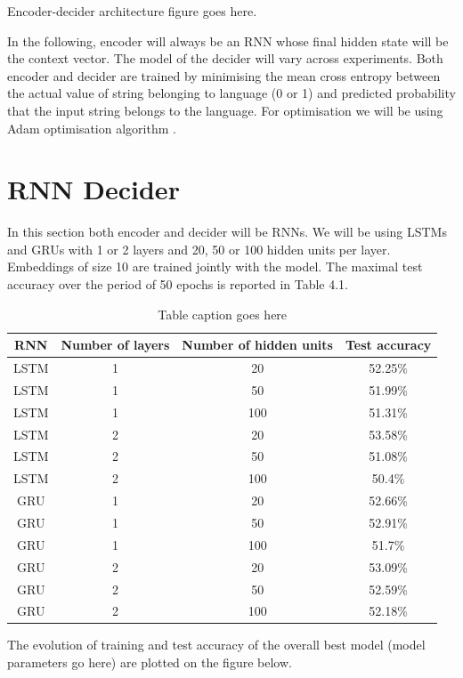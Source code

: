 \documentclass[titlepage]{report}
\newcommand{\otoprule}{\midrule[\heavyrulewidth]}
\begin{document}
\begin{center}
Encoder-decider architecture figure goes here.
\end{center}

In the following, encoder will always be an RNN whose final hidden state will be the context vector. The model of the decider will vary across experiments. Both encoder and decider are trained by minimising the mean cross entropy between the actual value of string belonging to language (0 or 1) and predicted probability that the input string belongs to the language. For optimisation we will be using Adam optimisation algorithm \cite{kingma2014adam}.

\section{RNN Decider}

In this section both encoder and decider will be RNNs. We will be using LSTMs and GRUs with 1 or 2 layers and 20, 50 or 100 hidden units per layer. Embeddings of size 10 are trained jointly with the model. The maximal test accuracy over the period of 50 epochs is reported in Table 4.1.

\begin{table}[H]
\caption{Table caption goes here}
\centering
\begin{tabular}{cccc}
\toprule%
\textbf{RNN} & \textbf{Number of layers} & \textbf{Number of hidden units} & \textbf{Test accuracy} \\
\otoprule%
LSTM & 1 & 20 & 52.25\% \\
LSTM & 1 & 50 & 51.99\% \\
LSTM & 1 & 100 & 51.31\% \\
LSTM & 2 & 20 & 53.58\% \\
LSTM & 2 & 50 & 51.08\% \\
LSTM & 2 & 100 & 50.4\% \\
GRU & 1 & 20 & 52.66\% \\ 
GRU & 1 & 50 & 52.91\% \\
GRU & 1 & 100 & 51.7\% \\
GRU & 2 & 20 & 53.09\% \\
GRU & 2 & 50 & 52.59\% \\
GRU & 2 & 100 & 52.18\% \\
\bottomrule
\end{tabular}
\label{table:nonlin}
\end{table}

The evolution of training and test accuracy of the overall best model (model parameters go here) are plotted on the figure below.
\end{document}
